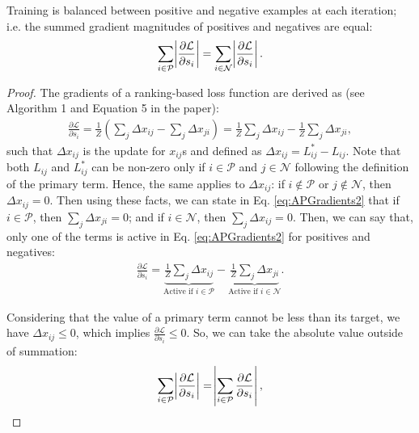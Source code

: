 \documentclass{article}
\newenvironment{customthm}[1]
  {\renewcommand\theinnercustomthm{#1}\innercustomthm}
  {\endinnercustomthm}
\begin{document}
\begin{customthm}{2}
Training is balanced between positive and negative examples at each iteration; i.e. the summed gradient magnitudes of positives and negatives are equal:
\begin{align}
\sum \limits_{i \in \mathcal{P}} \abs{\frac{\partial \mathcal{L}}{\partial s_i}} = \sum \limits_{i \in \mathcal{N}} \abs{\frac{\partial \mathcal{L}}{\partial s_i}}.
\end{align}
\end{customthm}
\begin{proof}
The gradients of a ranking-based loss function are derived as (see Algorithm 1 and Equation 5 in the paper):
\begin{align}
    \label{eq:APGradients2}
    \frac{\partial \mathcal{L}}{\partial s_i} 
    = \frac{1}{Z} \left( \sum \limits_{j} \Delta x_{ij} - \sum \limits_{j} \Delta x_{ji} \right) = \frac{1}{Z} \sum \limits_{j} \Delta x_{ij} - \frac{1}{Z} \sum \limits_{j} \Delta x_{ji},
\end{align}
such that $\Delta x_{ij}$ is the update for $x_{ij}$s and defined as $\Delta x_{ij}=L^*_{ij}-L_{ij}$. Note that both $L_{ij}$ and $L^*_{ij}$ can be non-zero only if $i \in \mathcal{P}$ and $j \in \mathcal{N}$ following the definition of the primary term. Hence, the same applies to $\Delta x_{ij}$: if $i \notin \mathcal{P}$ or $j \notin \mathcal{N}$, then $\Delta x_{ij}=0$. Then using these facts, we can state in Eq. \eqref{eq:APGradients2} that if $i \in \mathcal{P}$, then $\sum \limits_{j} \Delta x_{ji}=0$; and if $i \in \mathcal{N}$, then $\sum \limits_{j} \Delta x_{ij}=0$. Then, we can say that, only one of the terms is active in Eq. \eqref{eq:APGradients2} for positives and negatives:
\begin{align}
    \label{eq:APGradientsActive}
    \frac{\partial \mathcal{L}}{\partial s_i} 
    = \underbrace{\frac{1}{Z} \sum \limits_{j} \Delta x_{ij}}_{\text{Active if $i\in \mathcal{P}$}}  - \underbrace{ \frac{1}{Z} \sum \limits_{j} \Delta x_{ji}}_{\text{Active if $i\in \mathcal{N}$}}. 
\end{align}

Considering that the value of a primary term cannot be less than its target, we have $\Delta x_{ij} \leq 0$, which implies  $\frac{\partial \mathcal{L}}{\partial s_i} \leq 0$. So, we can take the absolute value outside of summation:
\begin{align}
\label{eq:GradientsToUpdates2}
\sum \limits_{i \in \mathcal{P}} \abs{\frac{\partial \mathcal{L}}{\partial s_i}} =\abs{ \sum \limits_{i \in \mathcal{P}} \frac{\partial \mathcal{L}}{\partial s_i}},
\end{align}


\end{proof}
\end{document}
